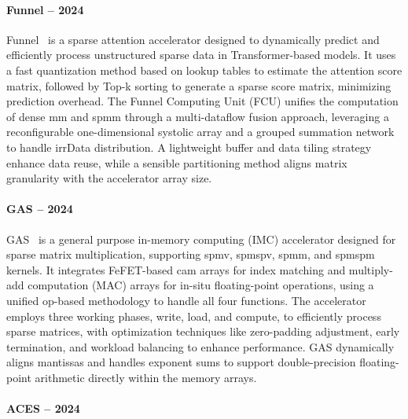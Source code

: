 \paragraph{Funnel -- 2024}

Funnel~\cite{Ma2024_Funnel} is a sparse attention accelerator designed to dynamically predict and efficiently process unstructured sparse data in Transformer-based models.
It uses a fast quantization method based on lookup tables to estimate the attention score matrix, followed by Top-k sorting to generate a sparse score matrix, minimizing prediction overhead.
The Funnel Computing Unit (FCU) unifies the computation of dense \acrshort{mm} and \acrshort{spmm} through a multi-dataflow fusion approach, leveraging a reconfigurable one-dimensional systolic array and a grouped summation network to handle \gls{irrData} distribution.
A lightweight buffer and data \gls{tiling} strategy enhance data reuse, while a sensible partitioning method aligns matrix granularity with the accelerator array size.

\paragraph{GAS -- 2024}

GAS~\cite{Zhang2024_GAS} is a general purpose in-memory computing (IMC) accelerator designed for sparse matrix multiplication, supporting \acrshort{spmv}, \acrshort{spmspv}, \acrshort{spmm}, and \acrshort{spmspm} kernels.
It integrates FeFET-based \acrfull{cam} arrays for index matching and multiply-add computation (MAC) arrays for in-situ floating-point operations, using a unified \acrlong{op}-based methodology to handle all four functions.
The accelerator employs three working phases, write, load, and compute, to efficiently process sparse matrices, with optimization techniques like zero-padding adjustment, early termination, and workload balancing to enhance performance.
GAS dynamically aligns mantissas and handles exponent sums to support double-precision floating-point arithmetic directly within the memory arrays.

\paragraph{ACES -- 2024}

